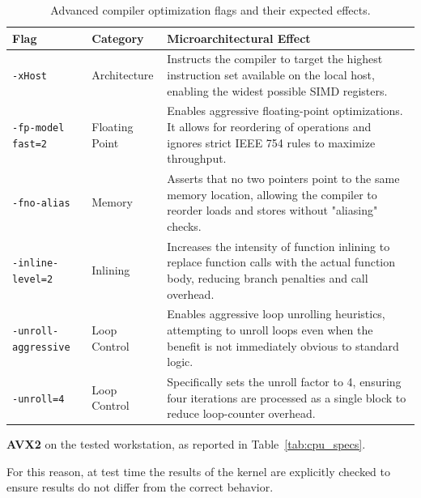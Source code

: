 \begin{table}[H]
\centering
\begin{threeparttable}
\caption{Advanced compiler optimization flags and their expected effects.}
\label{tab:advanced_flags}
\begin{tabular}{lp{3cm}p{7cm}}
\toprule
\textbf{Flag} & \textbf{Category} & \textbf{Microarchitectural Effect} \\
\midrule
\texttt{-xHost} & Architecture & Instructs the compiler to target the highest instruction set available on the local host\tnote{1}, enabling the widest possible SIMD registers. \\
\midrule
\texttt{-fp-model fast=2} & Floating Point & Enables aggressive floating-point optimizations. It allows for reordering of operations and ignores strict IEEE 754 rules to maximize throughput\tnote{2}. \\
\midrule
\texttt{-fno-alias} & Memory & Asserts that no two pointers point to the same memory location, allowing the compiler to reorder loads and stores without "aliasing" checks. \\
\midrule
\texttt{-inline-level=2} & Inlining & Increases the intensity of function inlining to replace function calls with the actual function body, reducing branch penalties and call overhead. \\
\midrule
\texttt{-unroll-aggressive} & Loop Control & Enables aggressive loop unrolling heuristics, attempting to unroll loops even when the benefit is not immediately obvious to standard logic. \\
\midrule
\texttt{-unroll=4} & Loop Control & Specifically sets the unroll factor to 4, ensuring four iterations are processed as a single block to reduce loop-counter overhead. \\
\bottomrule
\end{tabular}

\begin{tablenotes}
    \footnotesize %
    \item[1] \textbf{AVX2} on the tested workstation, as reported in Table~\ref{tab:cpu_specs}.
    \item[2] For this reason, at test time the results of the kernel are explicitly checked to ensure results do not differ from the correct behavior.
\end{tablenotes}
\end{threeparttable}
\end{table}